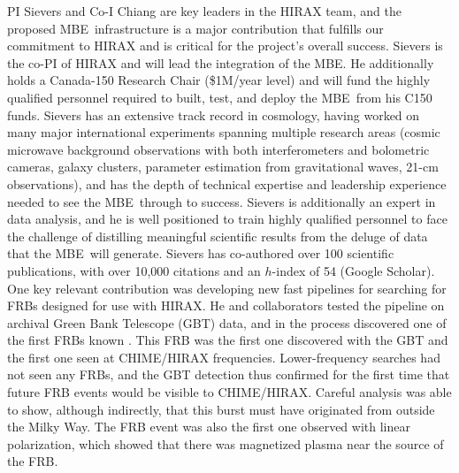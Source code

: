 \documentclass[letterpaper,11pt,preprint]{aastex}
\makeatletter
\newcommand{\mbe}{{\rm MBE}}
\def\section{\@startsection {section}{1}{\z@}{1.0ex plus 
1ex minus .2ex}{.2ex plus .2ex}{\large\bf}}
\makeatother
\begin{document}

\section{Researchers}

PI Sievers and Co-I Chiang are key leaders in the HIRAX team, and the
proposed \mbe\ infrastructure is a major contribution that fulfills
our commitment to HIRAX and is critical for the project's overall
success.  Sievers is the co-PI of HIRAX and will lead the integration
of the \mbe.  He additionally holds a Canada-150 Research Chair
(\$1M/year level) and will fund the highly qualified personnel
required to built, test, and deploy the \mbe\ from his C150 funds.
Sievers has an extensive track record in cosmology, having worked on
many major international experiments spanning multiple research areas
(cosmic microwave background observations with both interferometers
and bolometric cameras, galaxy clusters, parameter estimation from
gravitational waves, 21-cm observations), and has the depth of
technical expertise and leadership experience needed to see the
\mbe\ through to success.  Sievers is additionally an expert in data
analysis, and he is well positioned to train highly qualified
personnel to face the challenge of distilling meaningful scientific
results from the deluge of data that the \mbe\ will generate.  Sievers
has co-authored over 100 scientific publications, with over 10,000
citations and an $h$-index of 54 (Google Scholar).  One key relevant
contribution was developing new fast pipelines for searching for FRBs
designed for use with HIRAX.  He and collaborators tested the pipeline
on archival Green Bank Telescope (GBT) data, and in the process
discovered one of the first FRBs known \citep{Masui15}.  This FRB was
the first one discovered with the GBT and the first one seen at
CHIME/HIRAX frequencies.  Lower-frequency searches had not seen any
FRBs, and the GBT detection thus confirmed for the first time that
future FRB events would be visible to CHIME/HIRAX.  Careful analysis
was able to show, although indirectly, that this burst must have
originated from outside the Milky Way.  The FRB event was also the
first one observed with linear polarization, which showed that there
was magnetized plasma near the source of the FRB.
\end{document}
